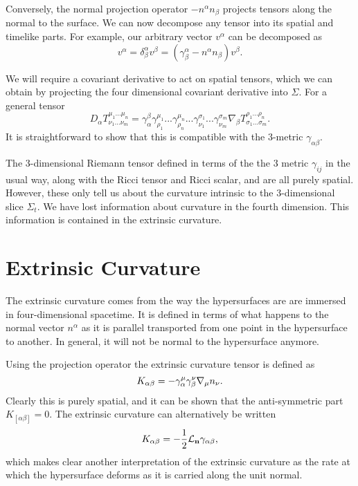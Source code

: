 Conversely, the normal projection operator $-n^\alpha n_\beta$ projects tensors along the normal to the surface. We can now decompose any tensor into its spatial and timelike parts. For example, our arbitrary vector $v^\alpha$ can be decomposed as 
\[ v^\alpha = \delta^\alpha_\beta v^\beta = (\gamma^\alpha_\beta - n^\alpha n_\beta)v^\beta. \]

We will require a covariant derivative to act on spatial tensors, which we can obtain by projecting the four dimensional covariant derivative into $\Sigma$. For a general tensor
\begin{equation}
D_\alpha T^{\mu_1 ... \mu_n}_{\nu_1 ... \nu_m}=\gamma^{\beta}_{\alpha} \gamma^{\mu_1}_{\rho_1}... \gamma^{\mu_n}_{\rho_n}...\gamma^{\sigma_1}_{\nu_1}... \gamma^{\sigma_m}_{\nu_m}\nabla_\beta T^{\rho_1 ... \rho_n}_{\sigma_1 ... \sigma_m}.
\end{equation}
It is straightforward to show that this is compatible with the 3-metric $\gamma_{\alpha \beta}$.  

The 3-dimensional Riemann tensor defined in terms of the the 3 metric $\gamma_{ij}$ in the usual way, along with the Ricci tensor and Ricci scalar, and are all purely spatial. However, these only tell us about the curvature intrinsic to the 3-dimensional slice $\Sigma_t$. We have lost information about curvature in the fourth dimension. This information is contained in the extrinsic curvature.

\section{Extrinsic Curvature}
The extrinsic curvature comes from the way the hypersurfaces are are immersed in four-dimensional spacetime. It is defined in terms of what happens to the normal vector $n^\alpha$ as it is parallel transported from one point in the hypersurface to another. In general, it will not be normal to the hypersurface anymore.

Using the projection operator the extrinsic curvature tensor is defined as 
\begin{equation}\label{eq:ExtCurve}
K_{\alpha \beta} = -\gamma_{\alpha}^{\mu} \gamma_{\beta}^{\nu} {\nabla} _{\mu} n_{\nu}. 
\end{equation}
Clearly this is purely spatial, and it can be shown that the anti-symmetric part $K_{[\alpha \beta]}=0$. The extrinsic curvature can alternatively be written 
\begin{equation}
\label{eq:ExtCurve2}
K_{\alpha \beta}=-\frac{1}{2} {\mathcal{L}}_{\mathbf{n}} \gamma_{\alpha \beta},
\end{equation}
which makes clear another interpretation of the extrinsic curvature as the rate at which the hypersurface deforms as it is carried along the unit normal.

